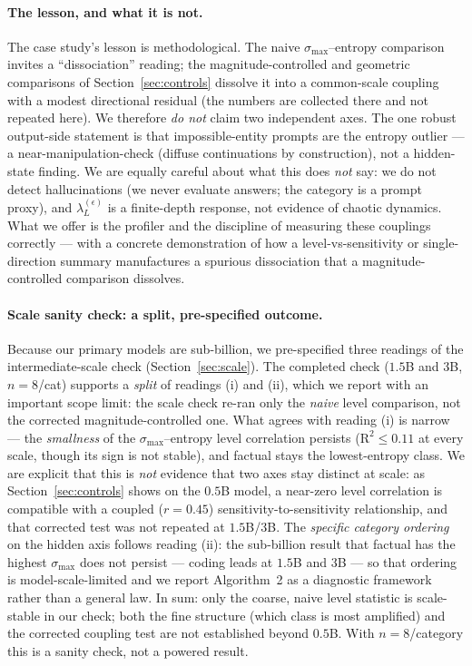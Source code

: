 \documentclass{article}
\begin{document}
\paragraph{The lesson, and what it is not.}
The case study's lesson is methodological. The naive $\sigma_{\max}$--entropy comparison invites a
``dissociation'' reading; the magnitude-controlled and geometric comparisons of
Section~\ref{sec:controls} dissolve it into a common-scale coupling with a modest directional residual
(the numbers are collected there and not repeated here). We therefore \emph{do not} claim two
independent axes. The one robust output-side statement is that impossible-entity
prompts are the entropy outlier --- a near-manipulation-check (diffuse continuations by construction),
not a hidden-state finding. We are equally careful about what this does \emph{not} say: we do not
detect hallucinations (we never evaluate answers; the category is a prompt proxy), and
$\lambda_L^{(\epsilon)}$ is a finite-depth response, not evidence of chaotic dynamics. What we offer is
the profiler and the discipline of measuring these couplings correctly --- with a concrete
demonstration of how a level-vs-sensitivity or single-direction summary manufactures a spurious
dissociation that a magnitude-controlled comparison dissolves.

\paragraph{Scale sanity check: a split, pre-specified outcome.}
Because our primary models are sub-billion, we pre-specified three readings of the
intermediate-scale check (Section~\ref{sec:scale}). The completed check ($1.5$B and $3$B, $n=8$/cat)
supports a \emph{split} of readings (i) and (ii), which we report with an important
scope limit: the scale check re-ran only the \emph{naive} level comparison, not the corrected
magnitude-controlled one. What agrees with reading (i) is narrow --- the \emph{smallness} of the
$\sigma_{\max}$--entropy level correlation persists ($\mathrm{R}^2\le0.11$ at every scale, though its
sign is not stable), and factual stays the lowest-entropy class. We are explicit that this is
\emph{not} evidence that two axes stay distinct at scale: as Section~\ref{sec:controls} shows on the
$0.5$B model, a near-zero level correlation is compatible with a coupled ($r=0.45$)
sensitivity-to-sensitivity relationship, and that corrected test was not repeated at $1.5$B/$3$B. The
\emph{specific category ordering} on the hidden axis follows reading (ii): the sub-billion result that
factual has the highest $\sigma_{\max}$ does not persist --- coding leads at $1.5$B and $3$B --- so that
ordering is model-scale-limited and we report Algorithm~2 as a diagnostic framework rather than a
general law. In sum: only the coarse, naive level statistic is scale-stable in
our check; both the fine structure (which class is most amplified) and the corrected coupling test are
not established beyond $0.5$B. With $n=8$/category this is a sanity check, not a powered result.
\end{document}
